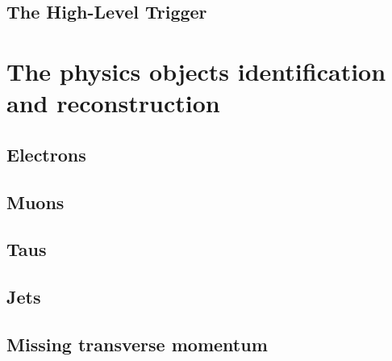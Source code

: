 \subsection{The High-Level Trigger}

\section{The physics objects identification and reconstruction}
\subsection{Electrons}
\subsection{Muons}
\subsection{Taus}
\subsection{Jets}
\subsection{Missing transverse momentum}
